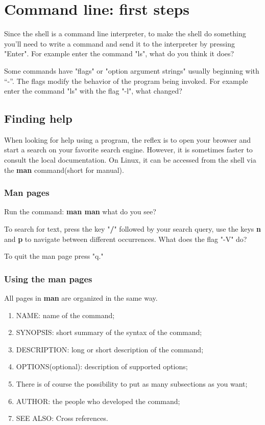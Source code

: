 \documentclass[11pt]{article}
\begin{document}
\section{Command line: first steps}
Since the shell is a command line interpreter, to make the shell do something you'll need to write a command and send it to the interpreter by pressing "Enter". For example enter the command "ls", what do you think it does?

Some commands have "flags" or "option argument strings" usually beginning with ``-''. The flags modify the behavior of the program being invoked. For example enter the command "ls" with the flag "-l", what changed?

\subsection{Finding help}
When looking for help using a program, the reflex is to open your browser and start a search on your favorite search engine. However, it is sometimes faster to consult the local documentation. On Linux, it can be accessed from the shell via the \textbf{man} command(short for manual).

\subsubsection{Man pages}
Run the command: \textbf{man man} what do you see?

\noindent To search for text, press the key "\textbf{/}" followed by your search query, use the keys \textbf{n} and \textbf{p} to navigate between different occurrences. What does the flag "-V" do?

\noindent To quit the man page press "q."

\subsubsection{Using the man pages}
All pages in \textbf{man} are organized in the same way.


\begin{enumerate}
	\item{NAME}: name of the command;
	\item{SYNOPSIS}: short summary of the syntax of the command;
	\item{DESCRIPTION}: long or short description of the command;
	\item{OPTIONS}(optional): description of supported options;
	\item There is of course the possibility to put as many subsections as you want;
	\item{AUTHOR}: the people who developed the command;
	\item{SEE ALSO}: Cross references.	
	
\end{enumerate}
\end{document}
